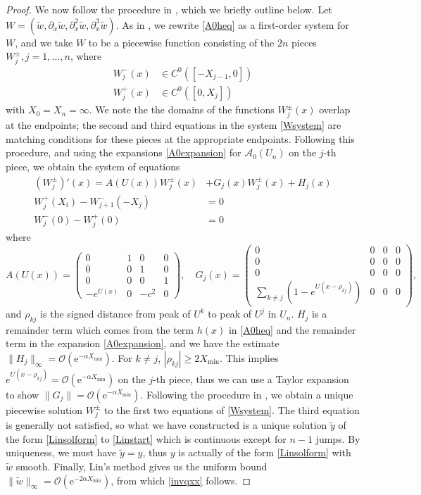 \documentclass[review,onefignum,onetabnum]{siamart171218}
\newcommand{\rme}{\mathrm{e}}
\newcommand{\calA}{\mathcal{A}}
\begin{document}
\begin{proof}
We now follow the procedure in \cite{sandstede:som98}, which we briefly outline below. Let $W = (\tilde{w}, \partial_x\tilde{w},\partial_x^2 \tilde{w},\partial_x^3 \tilde{w})$. As in \cite{sandstede:som98}, we rewrite \cref{A0heq} as a first-order system for $W$, and we take $W$ to be a piecewise function consisting of the $2n$ pieces $W_j^\pm, j = 1, \dots, n$, where
\begin{align*}
W_j^-(x) &\in C^0([-X_{j-1}, 0]) \\
W_j^+(x) &\in C^0([0, X_j])
\end{align*}
with $X_0 = X_n = \infty$. We note the the domains of the functions $W_j^\pm(x)$ overlap at the endpoints; the second and third equations in the system \cref{Wsystem} are matching conditions for these pieces at the appropriate endpoints. Following this procedure, and using the expansions \cref{A0expansion} for $\calA_0(U_n)$ on the $j$-th piece, we obtain the system of equations
\begin{equation}\label{Wsystem}
\begin{aligned}
(W_j^\pm)'(x) = A(U(x)) W_j^\pm(x) &+ G_j(x) W_j^\pm(x)+ H_j(x) \\
W_j^+(X_i) - W_{j+1}^-(-X_j) &= 0  \\
W_j^-(0) - W_j^+(0) &= 0
\end{aligned}
\end{equation}
where
\[
A(U(x)) = \begin{pmatrix}
0 & 1 & 0 & 0 \\
0 & 0 & 1 & 0 \\
0 & 0 & 0 & 1 \\
-e^{U(x)} & 0 & -c^2 & 0
\end{pmatrix}, \quad
G_j(x) = \begin{pmatrix}
0 & 0 & 0 & 0 \\
0 & 0 & 0 & 0 \\
0 & 0 & 0 & 0 \\
\sum_{k \neq j} (1 - e^{U(x - \rho_{kj})}) & 0 & 0 & 0
\end{pmatrix},
\]
and $\rho_{kj}$ is the signed distance from peak of $U^k$ to peak of $U^j$ in $U_n$. $H_j$ is a remainder term which comes from the term $h(x)$ in \cref{A0heq} and the remainder term in the expansion \cref{A0expansion}, and we have the estimate $\|H_j \|_\infty = \mathcal{O}(\rme^{-\alpha X_{\mathrm{min}}})$. For $k \neq j$, $|\rho_{kj}| \geq 2 X_{\mathrm{min}}$. This implies $e^{U(x - \rho_{kj})} = \mathcal{O}(\rme^{-\alpha X_{\mathrm{min}}})$ on the $j$-th piece, thus we can use a Taylor expansion to show $\|G_j\| = \mathcal{O}(\rme^{-\alpha X_{\mathrm{min}}})$. Following the procedure in \cite{sandstede:som98}, we obtain a unique piecewise solution $W_j^\pm$ to the first two equations of \cref{Wsystem}. The third equation is generally not satisfied, so what we have constructed is a unique solution $\tilde{y}$ of the form \cref{Linsolform} to \cref{Linstart} which is continuous except for $n - 1$ jumps. By uniqueness, we must have $\tilde{y} = y$, thus $y$ is actually of the form \cref{Linsolform} with $\tilde{w}$ smooth. Finally, Lin's method gives us the uniform bound
$\|\tilde{w}\|_\infty = \mathcal{O}(\rme^{-2 \alpha X_{\mathrm{min}}})$, from which \cref{invqxx} follows.
\end{proof}
\end{document}
